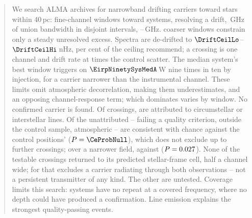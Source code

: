 \begin{abstract}
We search ALMA archives for narrowband drifting carriers toward
stars within 40\,pc: \NWinA{} fine-channel windows toward \NSysClassA{}
systems, \EdrNWinA{} resolving a drift, \CvUnionA\,GHz of union
bandwidth in \CovNIslands{} disjoint intervals,
\DomAFreqLo--\DomAFreqHi\,GHz. \NWinB{} coarser windows constrain only a
steady unresolved excess. Spectra are de-drifted to
$\DriftCeilLo$--$\DriftCeilHi$\,nHz, \AccelSheikhPct{} per cent of the
ceiling \citet{Sheikh2019} recommend; a crossing is one channel and drift
rate at \StageNullTrig{} times the control scatter.
The median system's best window triggers on $\EirpNinetySysMedA$\,W nine
times in ten by injection, for a carrier narrower than the instrumental
channel. These limits omit atmospheric decorrelation, making them
underestimates, and an opposing channel-response term; which dominates
varies by window.
No confirmed carrier is found. Of \EvNCrossRaw{} crossings, \MkAttr{} are
attributed to circumstellar or interstellar lines. Of the \MkUnattr{}
unattributed -- \PrFlagXrossWord{} failing a quality criterion,
\CeNTailCrossWord{} outside the control sample, \CeTlObsCutWord{}
atmospheric -- \CeObs{} are consistent with chance against the control
positions' \CeExp{} ($P=\CeProbNull$), which does not exclude up to
\CeAddLim{} further crossings; over a narrower field, \FrNarrowObs{}
against \FrNarrowExp{} ($P=\FrNarrowProb$).
None of the \RcNExcl{} testable crossings returned to its predicted
stellar-frame cell, half a channel wide; for \HjNPowerHi{} that excludes a
carrier radiating through both observations -- not a persistent transmitter
of any kind. The other \HjNPowerLo{} are untested. Coverage limits this
search: \ZcNoRepSys{} systems have no repeat at a covered frequency,
where no depth could have produced a confirmation. Line emission
explains the strongest quality-passing events.
\end{abstract}



